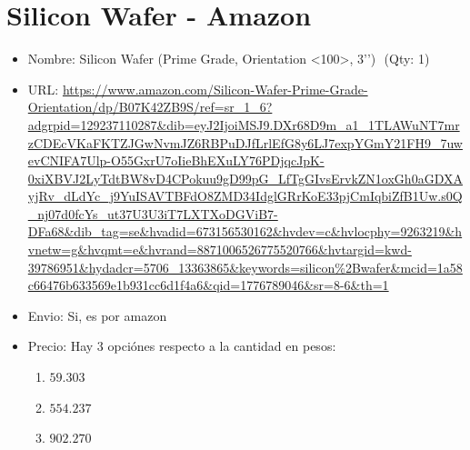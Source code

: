 \documentclass[a4paper]{article}
\begin{document}
\section{Silicon Wafer - Amazon}
\begin{itemize}
  \item Nombre:  Silicon Wafer (Prime Grade, Orientation <100>, 3’')  (Qty: 1) 
  \item URL: \url{https://www.amazon.com/Silicon-Wafer-Prime-Grade-Orientation/dp/B07K42ZB9S/ref=sr_1_6?adgrpid=129237110287&dib=eyJ2IjoiMSJ9.DXr68D9m_a1_1TLAWuNT7mrzCDEcVKaFKTZJGwNvmJZ6RBPuDJfLrlEfG8y6LJ7expYGmY21FH9_7uwevCNIFA7Ulp-O55GxrU7oIieBhEXuLY76PDjqcJpK-0xiXBVJ2LyTdtBW8vD4CPokuu9gD99pG_LfTgGIvsErvkZN1oxGh0aGDXAyjRv_dLdYc_j9YuISAVTBFdO8ZMD34IdglGRrKoE33pjCmIqbiZfB1Uw.s0Q_nj07d0fcYs_ut37U3U3iT7LXTXoDGViB7-DFa68&dib_tag=se&hvadid=673156530162&hvdev=c&hvlocphy=9263219&hvnetw=g&hvqmt=e&hvrand=8871006526775520766&hvtargid=kwd-39786951&hydadcr=5706_13363865&keywords=silicon\%2Bwafer&mcid=1a58c66476b633569e1b931cc6d1f4a6&qid=1776789046&sr=8-6&th=1}
  \item Envio: Si, es por amazon
  \item Precio: Hay 3 opciónes respecto a la cantidad en pesos: 
    \begin{enumerate}
      \item[1] $59.303$
      \item[10] $554.237$
      \item[50] $902.270$
    \end{enumerate}
\end{itemize}
\end{document}
